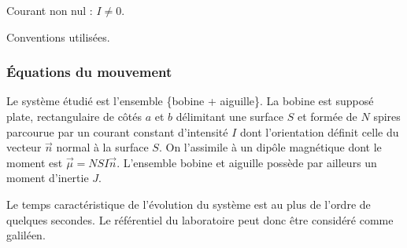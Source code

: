\documentclass[12pt,a4paper,fleqn]{article}
\begin{document}
\begin{multicols}{3}
\begin{center}
        Courant non nul : $I\neq0$.


        Conventions utilisées.
    \end{center}
\end{multicols}

\subsubsection{Équations du mouvement}

Le système étudié est l'ensemble \{bobine + aiguille\}.
La bobine est supposé plate, rectangulaire de côtés $a$ et $b$ délimitant une surface $S$ et formée de $N$ spires parcourue par un courant constant d'intensité $I$ dont l'orientation définit celle du vecteur $\vec{n}$ normal à la surface $S$.
On l'assimile à un dipôle magnétique dont le moment est $\vec{\mu} = NSI\vec{n}$.
L'ensemble bobine et aiguille possède par ailleurs un moment d'inertie $J$.

Le temps caractéristique de l'évolution du système est au plus de l'ordre de quelques secondes.
Le référentiel du laboratoire peut donc être considéré comme galiléen.
\end{document}
